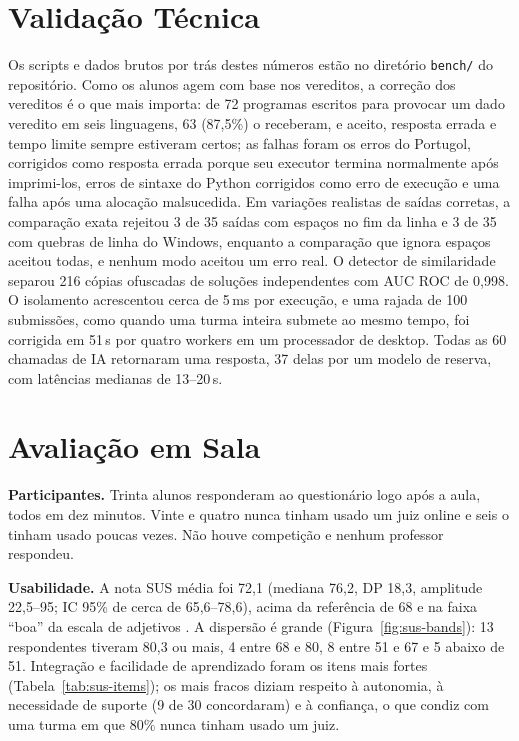\documentclass[12pt]{article}
\begin{document}
\section{Validação Técnica}\label{sec:validation}\label{sec:performance}\label{sec:perf-verdicts}\label{sec:perf-similarity}

Os scripts e dados brutos por trás destes números estão no diretório \texttt{bench/} do repositório. Como os alunos agem com base nos vereditos, a correção dos vereditos é o que mais importa: de 72 programas escritos para provocar um dado veredito em seis linguagens, 63 (87,5\%) o receberam, e aceito, resposta errada e tempo limite sempre estiveram certos; as falhas foram os erros do Portugol, corrigidos como resposta errada porque seu executor termina normalmente após imprimi-los, erros de sintaxe do Python corrigidos como erro de execução e uma falha após uma alocação malsucedida. Em variações realistas de saídas corretas, a comparação exata rejeitou 3 de 35 saídas com espaços no fim da linha e 3 de 35 com quebras de linha do Windows, enquanto a comparação que ignora espaços aceitou todas, e nenhum modo aceitou um erro real. O detector de similaridade separou 216 cópias ofuscadas de soluções independentes com AUC ROC de 0,998. O isolamento acrescentou cerca de 5\,ms por execução, e uma rajada de 100 submissões, como quando uma turma inteira submete ao mesmo tempo, foi corrigida em 51\,s por quatro workers em um processador de desktop. Todas as 60 chamadas de IA retornaram uma resposta, 37 delas por um modelo de reserva, com latências medianas de 13--20\,s.

\section{Avaliação em Sala}\label{sec:evaluation-status}

\textbf{Participantes.} Trinta alunos responderam ao questionário logo após a aula, todos em dez minutos. Vinte e quatro nunca tinham usado um juiz online e seis o tinham usado poucas vezes. Não houve competição e nenhum professor respondeu.

\textbf{Usabilidade.} A nota SUS média foi 72,1 (mediana 76,2, DP 18,3, amplitude 22,5--95; IC 95\% de cerca de 65,6--78,6), acima da referência de 68 \cite{sauro2011sus} e na faixa ``boa'' da escala de adjetivos \cite{bangor2009sus}. A dispersão é grande (Figura~\ref{fig:sus-bands}): 13 respondentes tiveram 80,3 ou mais, 4 entre 68 e 80, 8 entre 51 e 67 e 5 abaixo de 51. Integração e facilidade de aprendizado foram os itens mais fortes (Tabela~\ref{tab:sus-items}); os mais fracos diziam respeito à autonomia, à necessidade de suporte (9 de 30 concordaram) e à confiança, o que condiz com uma turma em que 80\% nunca tinham usado um juiz.
\end{document}
